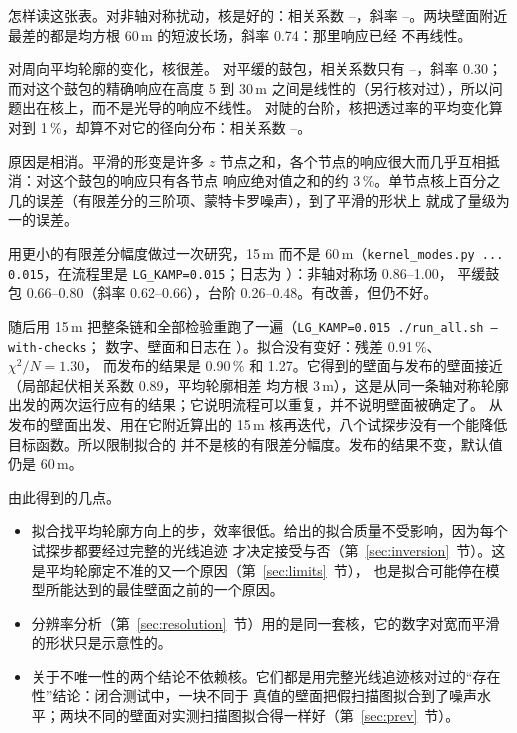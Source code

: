 \documentclass[11pt,a4paper,fontset=fandol]{ctexart}
\newcommand{\um}{\,\textmu m}
\newcommand{\code}[1]{\texttt{#1}}
\begin{document}
怎样读这张表。对非轴对称扰动，核是好的：相关系数 \JacCorrMin--\JacCorrMax，斜率
\JacSlopeMin--\JacSlopeMax。两块壁面附近最差的都是均方根 60\um{} 的短波长场，斜率 0.74：那里响应已经
不再线性。

对周向平均轮廓的变化，核很差。
对平缓的鼓包，相关系数只有 \JacBumpCorrMin--\JacBumpCorrMax，斜率 0.30；而对这个鼓包的精确响应在高度 5 到 30\um{} 之间是线性的（另行核对过），所以问题出在核上，而不是光导的响应不线性。
对陡的台阶，核把透过率的平均变化算对到 1\,\%，却算不对它的径向分布：相关系数
\JacStepCorrMin--\JacStepCorrMax。

原因是相消。平滑的形变是许多 $z$ 节点之和，各个节点的响应很大而几乎互相抵消：对这个鼓包的响应只有各节点
响应绝对值之和的约 3\,\%。单节点核上百分之几的误差（有限差分的三阶项、蒙特卡罗噪声），到了平滑的形状上
就成了量级为一的误差。

用更小的有限差分幅度做过一次研究，15\um{} 而不是 60\um（\code{kernel\_modes.py ... 0.015}，在流程里是
\code{LG\_KAMP=0.015}；日志为 ）：非轴对称场 0.86--1.00，
平缓鼓包 0.66--0.80（斜率 0.62--0.66），台阶 0.26--0.48。有改善，但仍不好。

随后用 15\um{} 把整条链和全部检验重跑了一遍（\code{LG\_KAMP=0.015 ./run\_all.sh --with-checks}；
数字、壁面和日志在 ）。拟合没有变好：残差 0.91\,\%、$\chi^2/N=1.30$，
而发布的结果是 0.90\,\% 和 1.27。它得到的壁面与发布的壁面接近（局部起伏相关系数 0.89，平均轮廓相差
均方根 3\um），这是从同一条轴对称轮廓出发的两次运行应有的结果；它说明流程可以重复，并不说明壁面被确定了。
从发布的壁面出发、用在它附近算出的 15\um{} 核再迭代，八个试探步没有一个能降低目标函数。所以限制拟合的
并不是核的有限差分幅度。发布的结果不变，默认值仍是 60\um。

由此得到的几点。
\begin{itemize}
\item 拟合找平均轮廓方向上的步，效率很低。给出的拟合质量不受影响，因为每个试探步都要经过完整的光线追迹
才决定接受与否（第~\ref{sec:inversion}~节）。这是平均轮廓定不准的又一个原因（第~\ref{sec:limits}~节），
也是拟合可能停在模型所能达到的最佳壁面之前的一个原因。
\item 分辨率分析（第~\ref{sec:resolution}~节）用的是同一套核，它的数字对宽而平滑的形状只是示意性的。
\item 关于不唯一性的两个结论不依赖核。它们都是用完整光线追迹核对过的“存在性”结论：闭合测试中，一块不同于
真值的壁面把假扫描图拟合到了噪声水平；两块不同的壁面对实测扫描图拟合得一样好（第~\ref{sec:prev}~节）。
\end{itemize}
\end{document}
